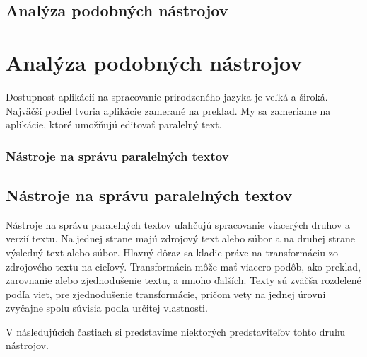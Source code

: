 \newpage
%
%
{
	\section{Analýza podobných nástrojov} 
}
{
	\chapter{Analýza podobných nástrojov}
}
Dostupnosť aplikácií na spracovanie prirodzeného jazyka je veľká a široká. Najväčší podiel tvoria aplikácie zamerané na preklad. My sa zameriame na aplikácie, ktoré umožňujú editovať paralelný text.

%
%
{
	\subsection{Nástroje na správu paralelných textov} 
}
{
	\section{Nástroje na správu paralelných textov}
}
Nástroje na správu paralelných textov uľahčujú spracovanie viacerých druhov a verzií textu. Na jednej strane majú zdrojový text alebo súbor a na druhej strane výsledný text alebo súbor. Hlavný dôraz sa kladie práve na transformáciu zo zdrojového textu na cieľový. Transformácia môže mať viacero podôb, ako preklad, zarovnanie alebo zjednodušenie textu, a mnoho ďalších. Texty sú zväčša rozdelené podľa viet, pre zjednodušenie transformácie, pričom vety na jednej úrovni zvyčajne spolu súvisia podľa určitej vlastnosti.

V následujúcich častiach si predstavíme niektorých predstaviteľov tohto druhu nástrojov.

